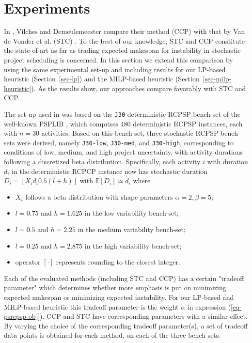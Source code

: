 \section{Experiments} 
\label{sec-experiments}	
 
 	In \cite{lamas2015}, Vilches and Demeulemeester 
 	compare their method (CCP) with 
 	that by Van de Vonder et al. (STC) \cite{van2008}.
 	To the best of our knowledge, STC and CCP constitute the state-of-art as far as
 	trading expected makespan for instability in stochastic project scheduling is concerned.
 	In this section we extend this comparison by using the same experimental set-up
 	and including results for our LP-based heuristic (Section~\ref{sec-lp}) and 
 	the MILP-based heuristic (Section~\ref{sec-milp-heuristic}).
 	As the results show, our approaches compare favorably with STC and CCP.  

  	The set-up used in \cite{lamas2015} was based 
  	on the \texttt{J30} deterministic RCPSP bench-set of the well-known PSPLIB \cite{kolisch1997psplib},
 	which comprises 480 deterministic RCPSP instances, each with $n=30$ activities.
 	Based on this bench-set, three stochastic RCPSP bench-sets were derived, 
 	namely \texttt{J30-low}, \texttt{J30-med}, and \texttt{J30-high},
  	corresponding to conditions of low, medium, and high project uncertainty,
 	with activity durations following a discretized beta distribution.
 	Specifically, each activity $i$ with duration $d_i$ in the deterministic RCPCP instance
 	now has stochastic duration $D_i = [X_i d_i 0.5 (l + h)]$ with $\mathbb{E}[D_i] \simeq d_i$ where
 	\begin{itemize}
 		\item $X_i$ follows a beta distribution with shape parameters $\alpha=2, \beta=5$;
 		\item $l = 0.75$ and $h = 1.625$ in the low variability bench-set;
 		\item $l = 0.5$ and $h = 2.25$ in the medium variability bench-set;
 		\item $l = 0.25$ and $h = 2.875$ in the high variability bench-set;
 		\item operator $[\cdot]$ represents rounding to the closest integer.
 	\end{itemize}

 	Each of the evaluated methods (including STC and CCP) has a certain "tradeoff parameter"
 	which determines whether more emphasis is put on minimizing
 	expected makespan or minimizing expected instability.
 	For our LP-based and MILP-based heuristic this tradeoff parameter 
 	is the weight $\alpha$ in expression (\ref{eq-psrcpsp-obj}).  
 	CCP and STC have corresponding parameters with a similar effect.
 	By varying the choice of the corresponding tradeoff parameter(s),
 	a set of tradeoff data-points is obtained for each method, on each of the three bench-sets.
  
